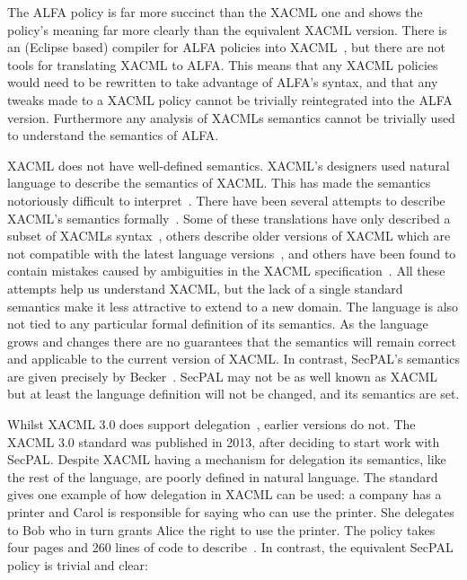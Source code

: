 \documentclass[thesis.tex]{subfiles}
\begin{document}
The ALFA policy is far more succinct than the XACML one and shows the
policy's meaning far more clearly than the equivalent XACML version.
There is an (Eclipse based) compiler for ALFA policies into
XACML~\cite{axiomaics_axiomatics_2012}, but there are not tools for
translating XACML to ALFA.  This means that any XACML policies would
need to be rewritten to take advantage of ALFA's syntax, and that any
tweaks made to a XACML policy cannot be trivially reintegrated into
the ALFA version.  Furthermore any analysis of XACMLs semantics cannot
be trivially used to understand the semantics of ALFA.

XACML does not have well-defined semantics. XACML's designers used
natural language to describe the semantics of XACML. This has made the
semantics notoriously difficult to
interpret~\cite{ramli_detecting_2015}. There have been several
attempts to describe XACML's semantics
formally~\cite{ramli_xacml_2012,ramli_logic_2014,bryans_reasoning_2005}. Some
of these translations have only described a subset of XACMLs
syntax~\cite{halpern_using_2008}, others describe older versions of
XACML which are not compatible with the latest language
versions~\cite{ahn_reasoning_2010}, and others have been found to
contain mistakes caused by ambiguities in the XACML
specification~\cite{bruns_access-control_2008,halpern_using_2008}.
All these attempts help us understand XACML, but the lack of a single
standard semantics make it less attractive to extend to a new domain.
The language is also not tied to any particular formal definition of
its semantics.  As the language grows and changes there are no
guarantees that the semantics will remain correct and applicable to
the current version of XACML. In contrast, SecPAL's semantics are
given precisely by Becker~\cite{becker_secpal:_2006}.  SecPAL may not
be as well known as XACML but at least the language definition will
not be changed, and its semantics are set.

Whilst XACML 3.0 does support delegation~\cite{oasis_xacml_2010},
earlier versions do not. The XACML 3.0 standard was published in 2013,
after deciding to start work with SecPAL.  Despite XACML having a
mechanism for delegation its semantics, like the rest of the language,
are poorly defined in natural language.  The standard gives one
example of how delegation in XACML can be used: a company has a
printer and Carol is responsible for saying who can use the printer.
She delegates to Bob who in turn grants Alice the right to use the
printer.  The policy takes four pages and 260 lines of code to
describe~\cite{oasis_xacml_2010}.  In contrast, the equivalent SecPAL
policy is trivial and clear:
\end{document}
